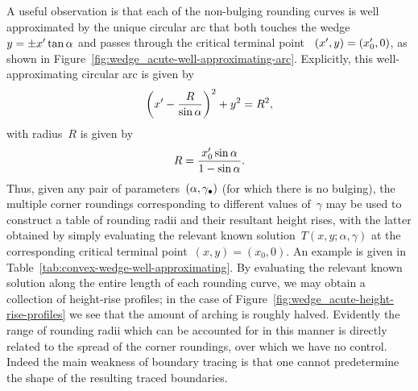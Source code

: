 A useful observation is that
each of the non-bulging rounding curves is well approximated
by the unique circular arc
that both touches the wedge~$y = \pm x' \tan\alpha$
and passes through the critical terminal point~%
  $(x', y) = (x'_0, 0)$,
as shown in Figure~\ref{fig:wedge_acute-well-approximating-arc}.
Explicitly, this well-approximating circular arc is given by
\begin{equation}
  \roundbr*{\offset{x} - \frac{R}{\sin\alpha}}^2 + y^2 = R^2,
  \label{eq:moderate-well-approximating-rounding-circle}
\end{equation}
with radius~$R$ is given by
\begin{equation}
  R = \frac{\offset{x}_0 \sin\alpha}{1 - \sin\alpha}.
  \label{eq:moderate-well-approximating-rounding-radius}
\end{equation}
Thus, given any pair of parameters~$(\alpha, \gamma_\bullet)$
(for which there is no bulging),
the multiple corner roundings corresponding to different values of~$\gamma$
may be used to construct a table of rounding radii
and their resultant height rises,
with the latter obtained by simply
evaluating the relevant known solution~$T (x, y; \alpha, \gamma)$
at the corresponding critical terminal point~$(x, y) = (x_0, 0)$.
An example is given in Table~\ref{tab:convex-wedge-well-approximating}.
By evaluating the relevant known solution
along the entire length of each rounding curve,
we may obtain a collection of height-rise profiles;
in the case of Figure~\ref{fig:wedge_acute-height-rise-profiles}
we see that the amount of arching is roughly halved.
Evidently the range of rounding radii
which can be accounted for in this manner
is directly related to the spread of the corner roundings,
over which we have no control.
Indeed the main weakness of boundary tracing is that
one cannot predetermine the shape of the resulting traced boundaries.

